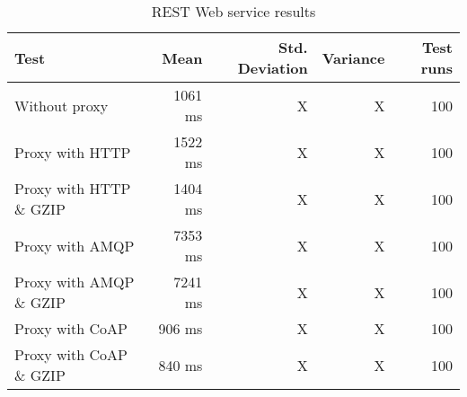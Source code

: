 \begin{appendices}
\begin{table}[H]
\begin{tabular}{| l | r | r | r | r |}
\hline
  \textbf{Test} & \textbf{Mean} & \textbf{Std. Deviation} & \textbf{Variance} & \textbf{Test runs}\\ \hline
  Without proxy & 1061 ms & X & X & 100 \\ \hline
  Proxy with HTTP & 1522 ms & X & X & 100 \\ \hline
  Proxy with HTTP \& GZIP & 1404 ms & X & X & 100 \\ \hline
  Proxy with AMQP & 7353 ms & X & X & 100 \\ \hline
  Proxy with AMQP \& GZIP & 7241 ms & X & X & 100\\ \hline
  Proxy with CoAP & 906 ms & X & X & 100 \\ \hline
  Proxy with CoAP \& GZIP & 840 ms & X & X & 100 \\ \hline
\end{tabular}
\caption{REST Web service results}
\end{table}



\end{appendices}
